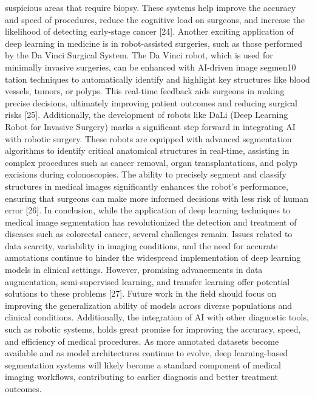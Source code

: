 suspicious areas that require biopsy. These systems help improve the accuracy and speed of
procedures, reduce the cognitive load on surgeons, and increase the likelihood of detecting
early-stage cancer [24].
Another exciting application of deep learning in medicine is in robot-assisted surgeries, such as those performed by the Da Vinci Surgical System. The Da Vinci robot, which
is used for minimally invasive surgeries, can be enhanced with AI-driven image segmen10
tation techniques to automatically identify and highlight key structures like blood vessels,
tumors, or polyps. This real-time feedback aids surgeons in making precise decisions, ultimately improving patient outcomes and reducing surgical risks [25]. Additionally, the
development of robots like DaLi (Deep Learning Robot for Invasive Surgery) marks a significant step forward in integrating AI with robotic surgery. These robots are equipped with
advanced segmentation algorithms to identify critical anatomical structures in real-time,
assisting in complex procedures such as cancer removal, organ transplantations, and polyp
excisions during colonoscopies. The ability to precisely segment and classify structures in
medical images significantly enhances the robot’s performance, ensuring that surgeons can
make more informed decisions with less risk of human error [26].
In conclusion, while the application of deep learning techniques to medical image
segmentation has revolutionized the detection and treatment of diseases such as colorectal
cancer, several challenges remain. Issues related to data scarcity, variability in imaging
conditions, and the need for accurate annotations continue to hinder the widespread implementation of deep learning models in clinical settings. However, promising advancements
in data augmentation, semi-supervised learning, and transfer learning offer potential solutions to these problems [27].
Future work in the field should focus on improving the generalization ability of
models across diverse populations and clinical conditions. Additionally, the integration of
AI with other diagnostic tools, such as robotic systems, holds great promise for improving
the accuracy, speed, and efficiency of medical procedures. As more annotated datasets
become available and as model architectures continue to evolve, deep learning-based segmentation systems will likely become a standard component of medical imaging workflows,
contributing to earlier diagnosis and better treatment outcomes.
